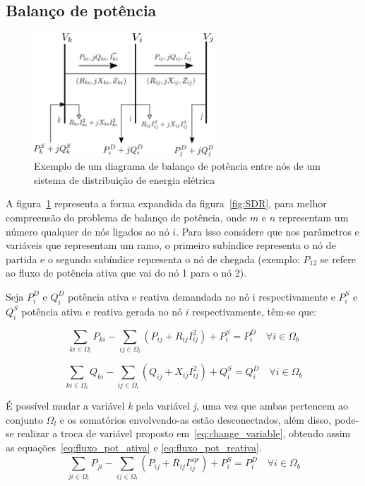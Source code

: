 \subsection{Balanço de potência}

\begin{figure}[H]
    \centering
    \includegraphics[width=0.6\textwidth]{3_Methodology/diagrama_nos.png}
    \caption{Exemplo de um diagrama de balanço de potência entre nós de um sistema de distribuição de energia elétrica}
    \label{fig:balanco_pot}
\end{figure}

A figura~\ref{fig:balanco_pot} representa a forma expandida da figura~\ref{fig:SDR}, para melhor compreensão do problema de balanço de potência, onde $m$ e $n$ representam um número qualquer de nós ligados ao nó $i$. 
Para isso considere que nos parâmetros e variáveis que representam um ramo, o primeiro subíndice representa o nó de partida e o segundo subíndice representa o nó de chegada (exemplo: $P_{12}$ se refere ao fluxo de potência ativa que vai do nó 1 para o nó 2).

Seja $P_{i}^{D}$ e $Q_{i}^{D}$ potência ativa e reativa demandada no nó i respectivamente e $P_{i}^{S}$ e $Q_{i}^{S}$ potência ativa e reativa gerada no nó $i$ respectivamente, têm-se que:

\begin{equation*}
    \sum_{ki\in\Omega_{l}}P_{ki} - \sum_{ij\in\Omega_{l}}(P_{ij} + R_{ij}I_{ij}^{2}) + P_{i}^{S} = P_{i}^{D}\quad\forall i \in\Omega_{b}
\end{equation*}

\begin{equation*}
    \sum_{ki\in\Omega_{l}}Q_{ki} - \sum_{ij\in\Omega_{l}}(Q_{ij} + X_{ij}I_{ij}^{2}) + Q_{i}^{S} = Q_{i}^{D}\quad\forall i \in\Omega_{b}
\end{equation*}

É possível mudar a variável \textit{k} pela variável \textit{j}, uma vez que ambas pertencem ao conjunto $\Omega_{l}$ e os somatórios envolvendo-as estão desconectados, além disso, pode-se realizar a troca de variável proposto em~\eqref{eq:change_variable}, obtendo assim as equações~\eqref{eq:fluxo_pot_ativa} e \eqref{eq:fluxo_pot_reativa}.
\begin{equation}
    \sum_{ji\in\Omega_{l}}P_{ji} - \sum_{ij\in\Omega_{l}}(P_{ij} + R_{ij}I_{ij}^{sqr}) + P_{i}^{S} = P_{i}^{D}\quad\forall i \in\Omega_{b}\label{eq:fluxo_pot_ativa}  
\end{equation}

